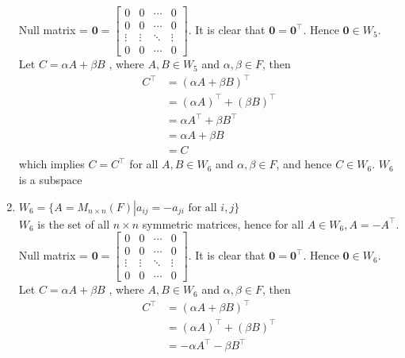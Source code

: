 \documentclass[a4paper, titlepage]{article}
\begin{document}
\begin{enumerate}[label=\textbf{\arabic*.}]
    Null matrix = $\textbf{0} =  
    \begin{bmatrix}
        0 & 0 & \cdots & 0 \\
        0 & 0 & \cdots & 0 \\
        \vdots & \vdots & \ddots & \vdots \\ 
        0 & 0 & \cdots & 0
    \end{bmatrix}$. It is clear that 
    $\textbf{0} = \textbf{0}^\intercal$. Hence $\textbf{0} \in W_5$. \hfill \\
    Let 
    $C = \alpha A + \beta B$
    , where $A, B \in W_5$ and $\alpha, \beta \in F$, then 
    \begin{align*}
        C^\intercal &= (\alpha A + \beta B)^\intercal \\
                    &= (\alpha A)^\intercal + (\beta B)^\intercal \\
                    &= \alpha A^\intercal + \beta B^\intercal \\
                    &= \alpha A + \beta B \\
                    &= C
    \end{align*}
    which implies $C = C^\intercal$ for all $A, B \in W_6$ and 
    $\alpha, \beta \in F$, and hence $C \in W_6$. $W_6$ is a subspace
    \item $W_6 = \{ A = M_{n\times n}(F) \left. \right\vert 
    a_{ij} = -a_{ji} \text{ for all } i, j \}$ \hfill \\
    $W_6$ is the set of all $n\times n$ symmetric matrices, hence for
    all $A \in W_6,{} A = -A^\intercal$. \hfill \\
    Null matrix = $\textbf{0} =  
    \begin{bmatrix}
        0 & 0 & \cdots & 0 \\
        0 & 0 & \cdots & 0 \\
        \vdots & \vdots & \ddots & \vdots \\ 
        0 & 0 & \cdots & 0
    \end{bmatrix}$. It is clear that 
    $\textbf{0} = \textbf{0}^\intercal$. Hence $\textbf{0} \in W_6$. \hfill \\
    Let 
    $C = \alpha A + \beta B$
    , where $A, B \in W_6$ and $\alpha, \beta \in F$, then 
    \begin{align*}
        C^\intercal &= (\alpha A + \beta B)^\intercal \\
                    &= (\alpha A)^\intercal + (\beta B)^\intercal \\
                    &= -\alpha A^\intercal - \beta B^\intercal \\

\end{align*}
\end{enumerate}
\end{document}
